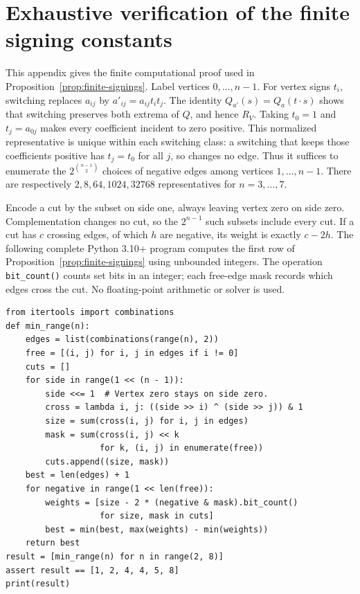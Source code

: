 \section{Exhaustive verification of the finite signing constants}
\label{app:finite-signings}
This appendix gives the finite computational proof used in
Proposition~\ref{prop:finite-signings}. Label vertices $0,\ldots,n-1$.
For vertex signs $t_i$, switching replaces $a_{ij}$ by
$a'_{ij}=a_{ij}t_it_j$. The identity $Q_{a'}(s)=Q_a(t\cdot s)$ shows
that switching preserves both extrema of $Q$, and hence $R_V$.
Taking $t_0=1$ and $t_j=a_{0j}$ makes every coefficient incident to zero
positive. This normalized representative is unique within each switching
class: a switching that keeps those coefficients positive has $t_j=t_0$
for all $j$, so changes no edge. Thus it suffices to enumerate the
$2^{\binom{n-1}{2}}$ choices of negative edges among vertices $1,\ldots,n-1$.
There are respectively $2,8,64,1024,32768$ representatives for $n=3,\ldots,7$.

Encode a cut by the subset on side one, always leaving vertex zero on
side zero. Complementation changes no cut, so the $2^{n-1}$ such subsets
include every cut. If a cut has $c$ crossing edges, of which $h$ are
negative, its weight is exactly $c-2h$. The following complete Python
3.10+ program computes the first row of Proposition~\ref{prop:finite-signings}
using unbounded integers. The operation \texttt{bit\_count()} counts set
bits in an integer; each free-edge mask records which edges cross the cut.
No floating-point arithmetic or solver is used.

\begin{small}
\begin{verbatim}
from itertools import combinations
def min_range(n):
    edges = list(combinations(range(n), 2))
    free = [(i, j) for i, j in edges if i != 0]
    cuts = []
    for side in range(1 << (n - 1)):
        side <<= 1  # Vertex zero stays on side zero.
        cross = lambda i, j: ((side >> i) ^ (side >> j)) & 1
        size = sum(cross(i, j) for i, j in edges)
        mask = sum(cross(i, j) << k
                   for k, (i, j) in enumerate(free))
        cuts.append((size, mask))
    best = len(edges) + 1
    for negative in range(1 << len(free)):
        weights = [size - 2 * (negative & mask).bit_count()
                   for size, mask in cuts]
        best = min(best, max(weights) - min(weights))
    return best
result = [min_range(n) for n in range(2, 8)]
assert result == [1, 2, 4, 4, 5, 8]
print(result)
\end{verbatim}
\end{small}

